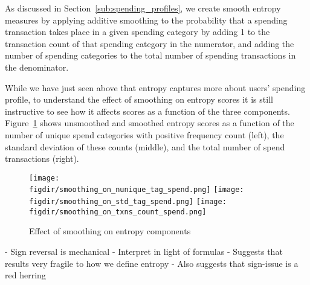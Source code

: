 As discussed in Section~\ref{sub:spending_profiles}, we create smooth entropy
measures by applying additive smoothing to the probability that a spending
transaction takes place in a given spending category by adding 1 to the
transaction count of that spending category in the numerator, and adding the
number of spending categories to the total number of spending transactions in
the denominator.

While we have just seen above that entropy captures more about users' spending
profile, to understand the effect of smoothing on entropy scores it is still
instructive to see how it affects scores as a function of the three components.
Figure~\ref{fig:effect_of_smoothing} shows unsmoothed and smoothed entropy
scores as a function of the number of unique spend categories with positive
frequency count (left), the standard deviation of these counts (middle), and
the total number of spend transactions (right).

\begin{figure}[h]
    \centering 
    \caption{Effect of smoothing on entropy components}
    \label{fig:effect_of_smoothing}
    \texttt{[image: \\figdir/smoothing\_on\_nunique\_tag\_spend.png]}
    \texttt{[image: \\figdir/smoothing\_on\_std\_tag\_spend.png]}
    \texttt{[image: \\figdir/smoothing\_on\_txns\_count\_spend.png]}
\end{figure}

- Sign reversal is mechanical
- Interpret in light of formulas
- Suggests that results very fragile to how we define entropy
- Also suggests that sign-issue is a red herring

